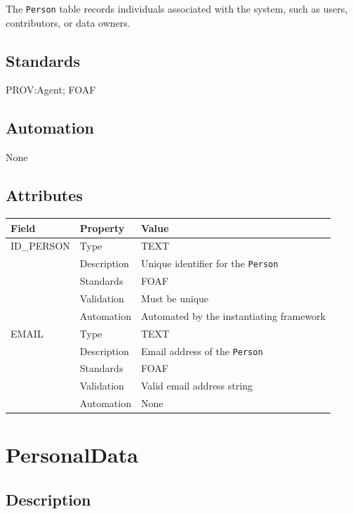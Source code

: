 \documentclass[
]{article}
\newcounter{none}
\begin{document}
The \texttt{Person} table records individuals associated with the
system, such as users, contributors, or data owners.

\subsection{Standards}\label{standards-22}

PROV:Agent; FOAF

\subsection{Automation}\label{automation-22}

None

\subsection{Attributes}\label{attributes-19}

{\def\LTcaptype{none} 
\begin{longtable}[]{@{}lll@{}}
\toprule\noalign{}
Field & Property & Value \\
\midrule\noalign{}
\endhead
\bottomrule\noalign{}
\endlastfoot
ID\_PERSON & Type & TEXT \\
& Description & Unique identifier for the \texttt{Person} \\
& Standards & FOAF \\
& Validation & Must be unique \\
& Automation & Automated by the instantiating framework \\
EMAIL & Type & TEXT \\
& Description & Email address of the \texttt{Person} \\
& Standards & FOAF \\
& Validation & Valid email address string \\
& Automation & None \\
\end{longtable}
}

\section{PersonalData}\label{personaldata}

\subsection{Description}\label{description-21}
\end{document}
